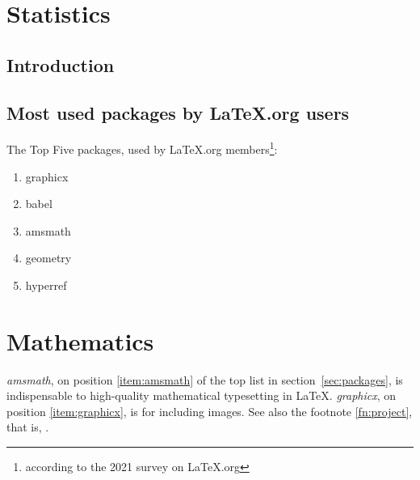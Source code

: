 \documentclass{book}
\begin{document}
\chapter{Statistics}
\section{Introduction}
\newpage
\section{Most used packages by LaTeX.org users}
\label{sec:packages}
The Top Five packages, used by LaTeX.org
members\footnote{according to the 2021 survey on
LaTeX.org\label{fn:project}}:
\begin{enumerate}
  \item graphicx\label{item:graphicx}
  \item babel
  \item amsmath\label{item:amsmath}
  \item geometry
  \item hyperref
\end{enumerate}
\chapter{Mathematics}
\emph{amsmath}, on position \vref{item:amsmath}
of the top list in section~\vref{sec:packages},
is indispensable to high-quality mathematical
typesetting in \LaTeX. \emph{graphicx}, on position
\vref{item:graphicx}, is for including images.
See also the footnote \vref{fn:project}, that is,
.
\end{document}

